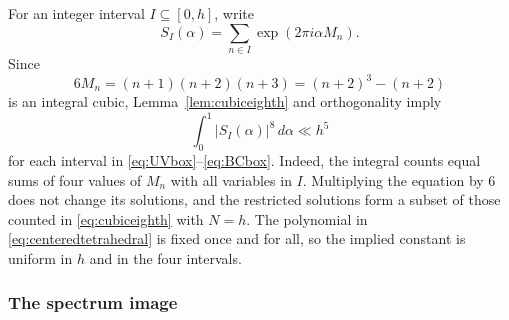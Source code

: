 \documentclass[11pt,reqno]{amsart}
\theoremstyle{definition}
\theoremstyle{remark}
\begin{document}
For an integer interval $I\subseteq[0,h]$, write
\[
 S_I(\alpha)=\sum_{n\in I}\exp(2\pi i\alpha M_n).
\]
Since
\begin{equation}\label{eq:centeredtetrahedral}
 6M_n=(n+1)(n+2)(n+3)=(n+2)^3-(n+2)
\end{equation}
is an integral cubic, Lemma~\ref{lem:cubiceighth} and orthogonality imply
\begin{equation}\label{eq:intervaleighth}
 \int_0^1|S_I(\alpha)|^8\,d\alpha\ll h^5
\end{equation}
for each interval in \eqref{eq:UVbox}--\eqref{eq:BCbox}.  Indeed, the
 integral counts equal sums of four values of $M_n$ with all variables in
 $I$.  Multiplying the equation by $6$ does not change its solutions, and
 the restricted solutions form a subset of those counted in
 \eqref{eq:cubiceighth} with $N=h$.
The polynomial in \eqref{eq:centeredtetrahedral} is fixed once and for all,
so the implied constant is uniform in $h$ and in the four intervals.

\subsubsection{The spectrum image}
\end{document}
